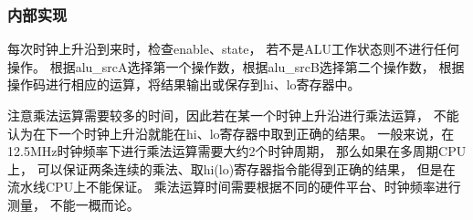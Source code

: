         \subsubsection{内部实现}
            每次时钟上升沿到来时，检查enable、state，%
            若不是ALU工作状态则不进行任何操作。%
            根据alu\_srcA选择第一个操作数，根据alu\_srcB选择第二个操作数，%
            根据操作码进行相应的运算，将结果输出或保存到hi、lo寄存器中。

            注意乘法运算需要较多的时间，因此若在某一个时钟上升沿进行乘法运算，%
            不能认为在下一个时钟上升沿就能在hi、lo寄存器中取到正确的结果。%
            一般来说，在12.5MHz时钟频率下进行乘法运算需要大约2个时钟周期，%
            那么如果在多周期CPU上，%
            可以保证两条连续的乘法、取hi(lo)寄存器指令能得到正确的结果，%
            但是在流水线CPU上不能保证。%
            乘法运算时间需要根据不同的硬件平台、时钟频率进行测量，%
            不能一概而论。
